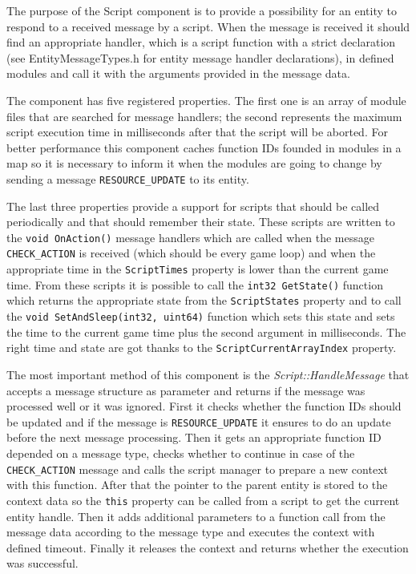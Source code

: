 \documentclass[a4paper, 12pt]{report}
\begin{document}
The purpose of the Script component is to provide a possibility for an entity to respond to a received message by a script. When the message is received it should find an appropriate handler, which is a script function with a strict declaration (see EntityMessageTypes.h for entity message handler declarations), in defined modules and call it with the arguments provided in the message data.

The component has five registered properties. The first one is an array of module files that are searched for message handlers; the second represents the maximum script execution time in milliseconds after that the script will be aborted. For better performance this component caches function IDs founded in modules in a map so it is necessary to inform it when the modules are going to change by sending a message \verb/RESOURCE_UPDATE/ to its entity.

The last three properties provide a support for scripts that should be called periodically and that should remember their state. These scripts are written to the \verb/void OnAction()/ message handlers which are called when the message \verb/CHECK_ACTION/ is received (which should be every game loop) and when the appropriate time in the \verb/ScriptTimes/ property is lower than the current game time. From these scripts it is possible to call the \verb/int32 GetState()/ function which returns the appropriate state from the \verb/ScriptStates/ property and to call the \verb/void SetAndSleep(int32, uint64)/ function which sets this state and sets the time to the current game time plus the second argument in milliseconds. The right time and state are got thanks to the \verb/ScriptCurrentArrayIndex/ property.

The most important method of this component is the \emph{Script::Handle\-Me\-ssa\-ge} that accepts a message structure as parameter and returns if the message was processed well or it was ignored. First it checks whether the function IDs should be updated and if the message is \verb/RESOURCE_UPDATE/ it ensures to do an update before the next message processing. Then it gets an appropriate function ID depended on a message type, checks whether to continue in case of the \verb/CHECK_ACTION/ message and calls the script manager to prepare a new context with this function. After that the pointer to the parent entity is stored to the context data so the \verb/this/ property can be called from a script to get the current entity handle. Then it adds additional parameters to a function call from the message data according to the message type and executes the context with defined timeout. Finally it releases the context and returns whether the execution was successful.
\end{document}
